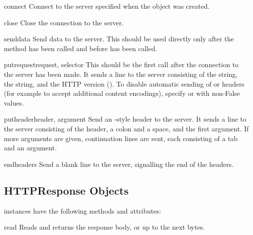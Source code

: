 \begin{methoddesc}{connect}{}
Connect to the server specified when the object was created.
\end{methoddesc}

\begin{methoddesc}{close}{}
Close the connection to the server.
\end{methoddesc}

\begin{methoddesc}{send}{data}
Send data to the server.  This should be used directly only after the
 method has been called and before
 has been called.
\end{methoddesc}

\begin{methoddesc}{putrequest}{request, selector}
This should be the first call after the connection to the server has
been made.  It sends a line to the server consisting of the
 string, the  string, and the HTTP version
().  To disable automatic sending of  or
 headers (for example to accept additional
content encodings), specify  or 
with non-False values.
\end{methoddesc}

\begin{methoddesc}{putheader}{header, argument}
Send an -style header to the server.  It sends a line to the
server consisting of the header, a colon and a space, and the first
argument.  If more arguments are given, continuation lines are sent,
each consisting of a tab and an argument.
\end{methoddesc}

\begin{methoddesc}{endheaders}{}
Send a blank line to the server, signalling the end of the headers.
\end{methoddesc}


\subsection{HTTPResponse Objects \label{httpresponse-objects}}

 instances have the following methods and attributes:

\begin{methoddesc}{read}{}
Reads and returns the response body, or up to the next  bytes.
\end{methoddesc}

